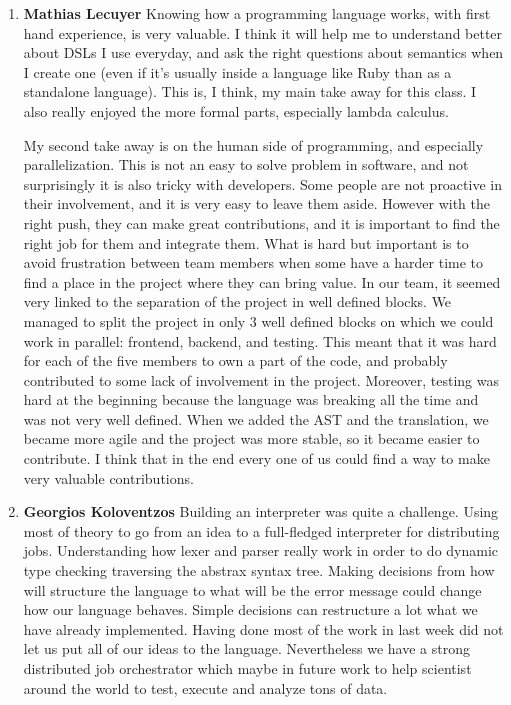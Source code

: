 \begin{enumerate}
\item \textbf{Mathias Lecuyer}
Knowing how a programming language works, with first hand experience, is very valuable.
I think it will help me to understand better about DSLs I use everyday, and ask the right questions about semantics when I create one (even if it's usually inside a language like Ruby than as a standalone language).
This is, I think, my main take away for this class. I also really enjoyed the more formal parts, especially lambda calculus.

My second take away is on the human side of programming, and especially parallelization.
This is not an easy to solve problem in software, and not surprisingly it is also tricky with developers.
Some people are not proactive in their involvement, and it is very easy to leave them aside.
However with the right push, they can make great contributions, and it is important to find the right job for them and integrate them.
What is hard but important is to avoid frustration between team members when some have a harder time to find a place in the project where they can bring value.
In our team, it seemed very linked to the separation of the project in well defined blocks.
We managed to split the project in only 3 well defined blocks on which we could work in parallel: frontend, backend, and testing.
This meant that it was hard for each of the five members to own a part of the code, and probably contributed to some lack of involvement in the project.
Moreover, testing was hard at the beginning because the language was breaking all the time and was not very well defined.
When we added the AST and the translation, we became more agile and the project was more stable, so it became easier to contribute.
I think that in the end every one of us could find a way to make very valuable contributions.


\item \textbf{Georgios Koloventzos}
Building an interpreter was quite a challenge. Using most of theory to go from an idea to a full-fledged interpreter
for distributing jobs. Understanding how lexer and parser really work in order to do dynamic type checking traversing
the abstrax syntax tree. Making decisions from how will structure the language to what will be the error message could change
how our language behaves. Simple decisions can restructure a lot what we have already implemented. Having done most of the work
in last week did not let us put all of our ideas to the language.
Nevertheless we have a strong distributed job orchestrator which maybe in future work to help scientist around the world
to test, execute and analyze tons of data.
\end{enumerate}

